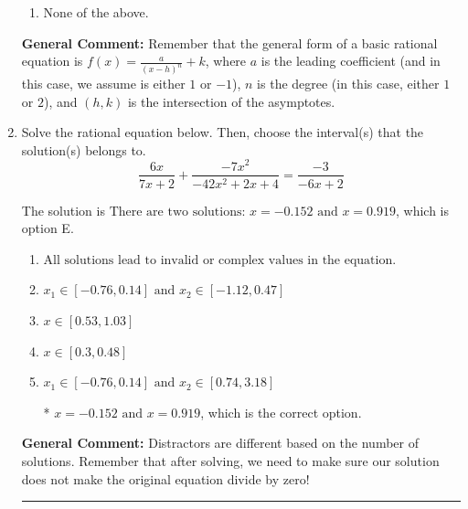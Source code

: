 \documentclass{extbook}[14pt]
\newcommand{\litem}[1]{\item #1

\rule{\textwidth}{0.4pt}}
\begin{document}
\begin{enumerate}
{\begin{enumerate}[label=\Alph*.]
\begin{multicols}{2}
\end{multicols}\item None of the above.\end{enumerate}
\textbf{General Comment:} Remember that the general form of a basic rational equation is $ f(x) = \frac{a}{(x-h)^n} + k$, where $a$ is the leading coefficient (and in this case, we assume is either $1$ or $-1$), $n$ is the degree (in this case, either $1$ or $2$), and $(h, k)$ is the intersection of the asymptotes.
}
\litem{
Solve the rational equation below. Then, choose the interval(s) that the solution(s) belongs to.
\[ \frac{6x}{7x + 2} + \frac{-7x^{2}}{-42x^{2} +2 x + 4} = \frac{-3}{-6x + 2} \]

The solution is \( \text{There are two solutions: } x = -0.152 \text{ and } x = 0.919 \), which is option E.\begin{enumerate}[label=\Alph*.]
\item \( \text{All solutions lead to invalid or complex values in the equation.} \)


\item \( x_1 \in [-0.76, 0.14] \text{ and } x_2 \in [-1.12,0.47] \)


\item \( x \in [0.53,1.03] \)


\item \( x \in [0.3,0.48] \)


\item \( x_1 \in [-0.76, 0.14] \text{ and } x_2 \in [0.74,3.18] \)

* $x = -0.152 \text{ and } x = 0.919$, which is the correct option.
\end{enumerate}

\textbf{General Comment:} Distractors are different based on the number of solutions. Remember that after solving, we need to make sure our solution does not make the original equation divide by zero!
}
\end{enumerate}
\end{document}
